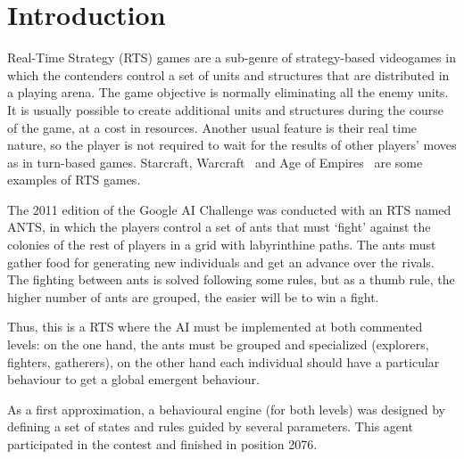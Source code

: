 \documentclass[runningheads]{llncs}
\begin{document}

\section{Introduction}

Real-Time Strategy (RTS) games are a sub-genre of strategy-based videogames in which the contenders control a set of units and structures that are distributed in a playing arena. The game objective is normally eliminating all the enemy units. It is usually possible to create additional units and structures during the course of the game, at a cost in resources. Another usual feature is their real time nature, so the player is not required to wait for the results of other players' moves as in turn-based games. Starcraft\texttrademark, Warcraft\texttrademark~ and Age of Empires\texttrademark~ are some examples of RTS games.   

The 2011 edition of the Google AI Challenge \cite{webGAIC} was conducted with an RTS named ANTS, in which the players control a set of ants that must `fight' against the colonies of the rest of players in a grid with labyrinthine paths. The ants must gather food for generating new individuals and get an advance over the rivals. The fighting between ants is solved following some rules, but as a thumb rule, the higher number of ants are grouped, the easier will be to win a fight.

Thus, this is a RTS where the AI must be implemented at both commented levels: on the one hand, the ants must be grouped and specialized (explorers, fighters, gatherers), on the other hand each individual should have a particular behaviour to get a global emergent behaviour.

As a first approximation, a behavioural engine (for both levels) was designed by defining a set of states and rules guided by several parameters. This agent participated in the contest and finished in position 2076. %
\end{document}
